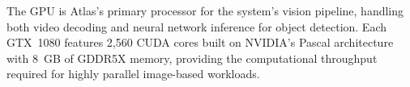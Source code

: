 \documentclass{erauthesis}
\begin{document}


  



The GPU is Atlas's primary processor for the system’s vision pipeline, handling both video decoding and neural network inference for object detection.
Each GTX~1080 features 2,560 CUDA cores built on NVIDIA’s Pascal architecture with 8~GB of GDDR5X memory, providing the computational throughput required for highly parallel image-based workloads.  
  
\end{document}
